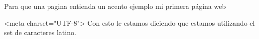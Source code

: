 Para que una pagina entienda un acento ejemplo mi primera página web

<meta charset="UTF-8">  Con esto le estamos diciendo que estamos utilizando el set de caracteres latino.